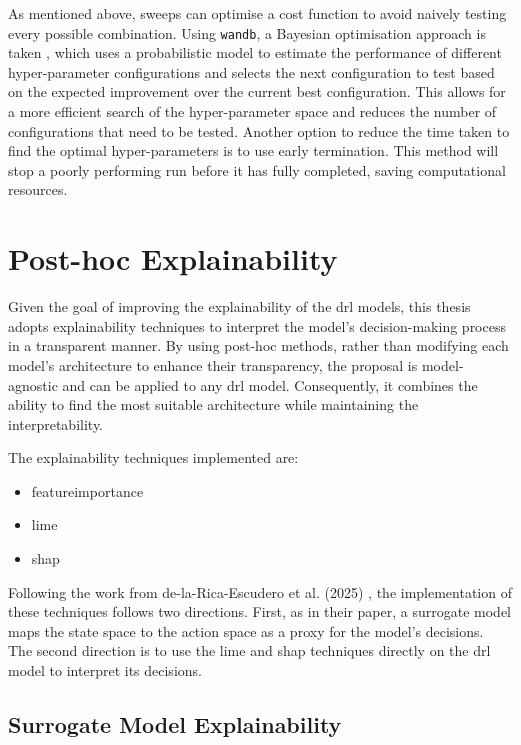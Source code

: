 As mentioned above, sweeps can optimise a cost function to avoid naively testing every possible combination. Using \texttt{wandb}, a Bayesian optimisation approach is taken \cite{Falkner2018}, which uses a probabilistic model to estimate the performance of different hyper-parameter configurations and selects the next configuration to test based on the expected improvement over the current best configuration. This allows for a more efficient search of the hyper-parameter space and reduces the number of configurations that need to be tested. Another option to reduce the time taken to find the optimal hyper-parameters is to use early termination. This method will stop a poorly performing run before it has fully completed, saving computational resources.

\section{Post-hoc Explainability} \label{sec:post_hoc_explainability}

Given the goal of improving the explainability of the \acrshort{drl} models, this thesis adopts explainability techniques to interpret the model's decision-making process in a transparent manner. By using post-hoc methods, rather than modifying each model's architecture to enhance their transparency, the proposal is model-agnostic and can be applied to any \acrshort{drl} model. Consequently, it combines the ability to find the most suitable architecture while maintaining the interpretability.

The explainability techniques implemented are: 
\begin{itemize}
    \item \Gls{featureimportance}
    \item \acrfull{lime}
    \item \acrfull{shap}
\end{itemize}

Following the work from de-la-Rica-Escudero et al. (2025) \cite{de-La-Rica-Escudero2025}, the implementation of these techniques follows two directions. First, as in their paper, a surrogate model maps the state space to the action space as a proxy for the model's decisions. The second direction is to use the \acrshort{lime} and \acrshort{shap} techniques directly on the \acrshort{drl} model to interpret its decisions.

\subsection{Surrogate Model Explainability} \label{subsec:surrogate_model_explainability}

